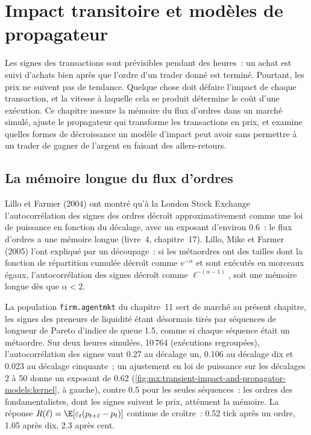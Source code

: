 \chapter{Impact transitoire et modèles de propagateur}\label{ch:mx:transient-impact-and-propagator-models}

Les signes des transactions sont prévisibles pendant des heures~: un achat est suivi d'achats bien après que l'ordre d'un trader donné est terminé. Pourtant, les prix ne suivent pas de tendance.
Quelque chose doit défaire l'impact de chaque transaction, et la vitesse à laquelle cela se produit détermine le coût d'une exécution. Ce chapitre mesure la mémoire du flux d'ordres dans un
marché simulé, ajuste le propagateur qui transforme les transactions en prix, et examine quelles formes de décroissance un modèle d'impact peut avoir sans permettre à un trader
de gagner de l'argent en faisant des allers-retours.

\section{La mémoire longue du flux d'ordres}

Lillo et Farmer (2004) ont montré qu'à la London Stock Exchange l'autocorrélation des signes des ordres décroît approximativement comme une loi de puissance en fonction du décalage, avec un
exposant d'environ 0.6~: le flux d'ordres a une mémoire longue (livre~4, chapitre~17). Lillo, Mike et Farmer (2005) l'ont expliqué par un découpage~: si les métaordres
ont des tailles dont la fonction de répartition cumulée décroît comme $v^{-\alpha}$ et sont exécutés en morceaux égaux, l'autocorrélation des signes décroît comme
$\ell^{-(\alpha-1)}$, soit une mémoire longue dès que $\alpha<2$.

La population \texttt{firm.agentmkt} du chapitre~11 sert de marché au présent chapitre, les signes des preneurs de liquidité étant désormais tirés par séquences de longueur de Pareto d'indice de queue 1.5, comme
si chaque séquence était un métaordre. Sur deux heures simulées, 10\,764  (exécutions regroupées), l'autocorrélation des signes vaut 0.27 au décalage un, 0.106 au
décalage dix et 0.023 au décalage cinquante~; un ajustement en loi de puissance sur les décalages 2 à 50 donne un exposant de 0.62 (\cref{fig:mx:transient-impact-and-propagator-models:kernel},
à gauche), contre 0.5 pour les seules séquences~: les ordres des fondamentalistes, dont les signes suivent le prix, atténuent la mémoire. La réponse
$R(\ell)=\E[\varepsilon_t(p_{t+\ell}-p_t)]$ continue de croître~: 0.52 tick après un ordre, 1.05 après dix, 2.3 après cent.

